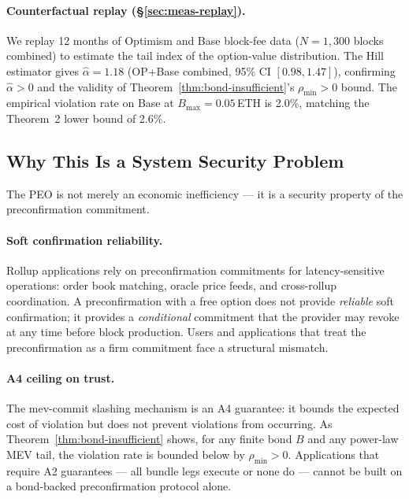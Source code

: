 \paragraph{Counterfactual replay (\S\ref{sec:meas-replay}).}
We replay 12 months of Optimism and Base block-fee data ($N=1{,}300$ blocks
combined) to estimate the tail index of the option-value distribution.
The Hill estimator gives $\hat{\alpha} = 1.18$ (OP+Base combined, 95\% CI
$[0.98, 1.47]$), confirming $\hat{\alpha} > 0$ and the validity of
Theorem~\ref{thm:bond-insufficient}'s $\rho_{\min} > 0$ bound. The empirical
violation rate on Base at $B_{\max} = 0.05$\,ETH is 2.0\%, matching the
Theorem~2 lower bound of 2.6\%.

\subsection{Why This Is a System Security Problem}
\label{sec:peo-security}

The PEO is not merely an economic inefficiency --- it is a security property
of the preconfirmation commitment.

\paragraph{Soft confirmation reliability.}
Rollup applications rely on preconfirmation commitments for latency-sensitive
operations: order book matching, oracle price feeds, and cross-rollup
coordination. A preconfirmation with a free option does not provide
\emph{reliable} soft confirmation; it provides a \emph{conditional}
commitment that the provider may revoke at any time before block
production. Users and applications that treat the preconfirmation as a
firm commitment face a structural mismatch.

\paragraph{A4 ceiling on trust.}
The mev-commit slashing mechanism is an A4 guarantee: it bounds the
expected cost of violation but does not prevent violations from occurring.
As Theorem~\ref{thm:bond-insufficient} shows, for any finite bond $B$
and any power-law MEV tail, the violation rate is bounded below by
$\rho_{\min} > 0$. Applications that require A2 guarantees --- all bundle
legs execute or none do --- cannot be built on a bond-backed preconfirmation
protocol alone.

